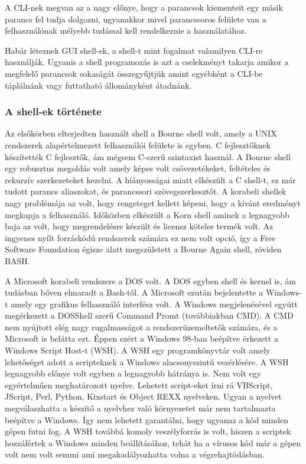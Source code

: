 \documentclass[12pt,oneside,justify,table]{book}
\begin{document}
A CLI-nek megvan az a nagy előnye, hogy a parancsok kiementeit egy másik parancs fel tudja dolgozni, ugyanakkor mivel parancssoros felülete van a felhasználónak mélyebb tudással kell rendelkeznie a használatához.

Habár léteznek GUI shell-ek, a shell-t mint fogalmat valamilyen CLI-re használják. Ugyanis a shell programozás is azt a cselekményt takarja amikor a megfelelő parancsok sokaságát összegyűjtjük amint egyébként a CLI-be táplálnánk vagy futtatható állományként átadnánk.
\cite{WindowsPowerShellUnleashed}

\subsubsection{A shell-ek története}
Az elsőkörben elterjedten használt shell a Bourne shell volt, amely a UNIX rendszerek alapértelmezett felhasználói felülete is egyben. C fejlesztőknek készítették C fejlesztők, ám mégsem C-szerű szintaxist használ. A Bourne shell egy robusztus megoldás volt amely képes volt csővezetékeket, feltételes és rekurzív szerkezeteket kezelni. A hiányosságai miatt elkészült a C shell-t, ez már tudott parancs aliaszokat, és parancssori szövegszerkesztőt. A korabeli shellek nagy problémája az volt, hogy rengeteget kellett képeni, hogy a kívánt eredményt megkapja a felhasználó. 
Időközben elkészült a Korn shell aminek a legnagyobb baja az volt, hogy megrendelésre készült és licensz köteles termék volt. Az ingyenes nyílt forráskódú rendszerek számára ez nem volt opció, így a Free Software Foundation égisze alatt megszületett a Bourne Again shell, röviden BASH.

A Microsoft korabeli rendszere a DOS volt. A DOS egyben shell és kernel is, ám tudásban bőven elmaradt a Bash-től. A Microsoft ezután bejelentette a Windows-t amely egy grafikus felhasználó interfész volt. A Windows megjelenésével együtt megérkezett a DOSShell szerű Command Promt (továbbiakban CMD). 
A CMD nem nyújtott elég nagy rugalmasságot a rendszerüzemeltetők számára, és a Microsoft is belátta ezt. Éppen ezért a Windows 98-ban beépítve érkezett a Windows Script Host-t (WSH). A WSH egy programkönyvtár volt amely lehetőséget adott a scripteknek a Windows alacsonyszintű vezérlésére.
A WSH legnagyobb előnye volt egyben a legnagyobb hátránya is. Nem volt egy egyértelműen meghatározott nyelve. Lehetett script-eket írni rá VBScript, JScript, Perl, Python, Kixstart és Object REXX nyelveken. Ugyan a nyelvet megválaszhatta a készítő a nyelvhez való környezetet már nem tartalmazta beépítve a Windows. Így nem lehetett garantálni, hogy ugyanaz a kód minden gépen futni fog. A WSH továbbá komoly veszélyforrás is volt, hiszen a scriptek hozzáfértek a Windows minden beállításához, tehát ha a vírusos kód már a gépen volt nem volt semmi ami megakadályozhatta volna a végrehajtódásban.
\end{document}
